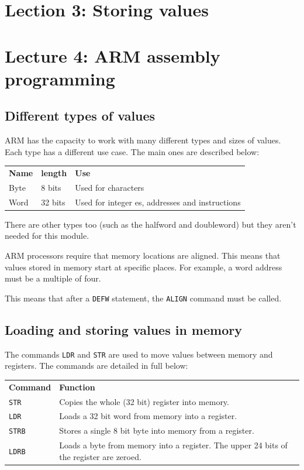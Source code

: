 \documentclass{article}
\begin{document}
\section{Lection 3: Storing values}

\section{Lecture 4: ARM assembly programming}

\subsection{Different types of values}

ARM has the capacity to work with many different types and sizes of values. Each type has a different use case. The main ones are described below:

\begin{tabularx}{\textwidth}{l l X}
	{\bf Name} & {\bf length} & {\bf Use}\\
	Byte & 8 bits & Used for characters\\
	Word & 32 bits & Used for integer es, addresses and instructions\\
\end{tabularx}

There are other types too (such as the halfword and doubleword) but they aren't needed for this module.

ARM processors require that memory locations are aligned. This means that values stored in memory start at specific places. For example, a word address must be a multiple of four.

This means that after a {\tt DEFW} statement, the {\tt ALIGN} command must be called.

\subsection{Loading and storing values in memory}

The commands {\tt LDR} and {\tt STR} are used to move values between memory and registers. The commands are detailed in full below:

\begin{tabularx}{\textwidth}{l X}
	{\bf Command} & {\bf Function}\\
	{\tt STR} & Copies the whole (32 bit) register into memory.\\
	{\tt LDR} & Loads a 32 bit word from memory into a register.\\
	{\tt STRB} & Stores a single 8 bit byte into memory from a register.\\
	{\tt LDRB} & Loads a byte from memory into a register. The upper 24 bits of the register are zeroed.\\
\end{tabularx}
\end{document}
